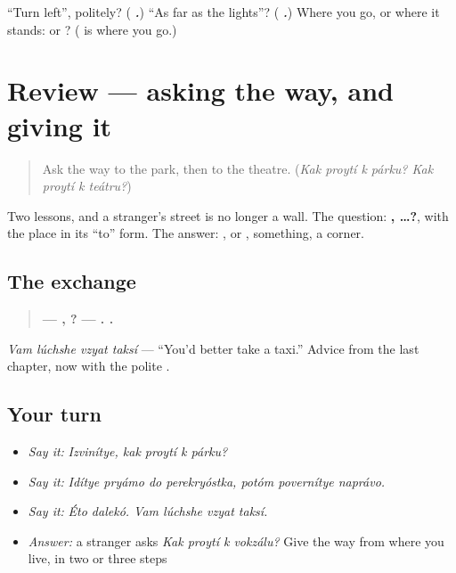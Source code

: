\begin{tcolorbox}[breakable,colback=teal!4,colframe=teal!35!black,title={Before you move on}]
\textquotedblleft{}Turn left\textquotedblright{}, politely? (\emph{\textbf{ .}}) \textquotedblleft{}As far as the lights\textquotedblright{}? (\emph{\textbf{ .}}) Where you go, or where it stands: \emph{} or \emph{}? (\emph{\textbf{}} is where you go.)
\end{tcolorbox}
\section[(review)]{Review — asking the way, and giving it}

\label{lesson:RU-C265-review}



\begin{quote}
Ask the way to the park, then to the theatre. (\emph{Kak proytí k párku? Kak proytí k teátru?})
\end{quote}

\begin{grammarlens}[title={What you've built}]
Two lessons, and a stranger's street is no longer a wall. The question: \textbf{,    …?}, with the place in its \textquotedblleft{}to\textquotedblright{} form. The answer: \textbf{ }, \textbf{ } or \textbf{}, \textbf{} something, \textbf{} a corner.
\end{grammarlens}

\subsection*{The exchange}
\begin{quote}
\textbf{— ,    ?} \textbf{—  .    .}
\end{quote}

\emph{Vam lúchshe vzyat taksí} — \textquotedblleft{}You'd better take a taxi.\textquotedblright{} Advice from the last chapter, now with the polite \textbf{}.

\subsection*{Your turn}
\begin{itemize}
\raggedright
  \item \emph{Say it:} \emph{Izvinítye, kak proytí k párku?}
  \item \emph{Say it:} \emph{Idítye pryámo do perekryóstka, potóm povernítye naprávo.}
  \item \emph{Say it:} \emph{Éto dalekó. Vam lúchshe vzyat taksí.}
  \item \emph{Answer:} a stranger asks \emph{Kak proytí k vokzálu?} Give the way from where you live, in two or three steps
\end{itemize}

